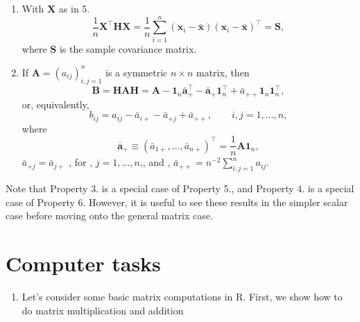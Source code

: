 \documentclass[]{book}
\providecommand{\tightlist}{%
  \setlength{\itemsep}{0pt}\setlength{\parskip}{0pt}}
\theoremstyle{definition}
\theoremstyle{definition}
\theoremstyle{definition}
\theoremstyle{remark}
\begin{document}
\begin{enumerate}
\[\begin{array}{ccc}
  -&(\boldsymbol x_2 -\bar{\boldsymbol x})^\top&-\\
  &\vdots&\\
  -&(\boldsymbol x_n - \bar{\boldsymbol x})^\top&-
  \end{array}\right ]= \left[ \boldsymbol x_1 -\bar{\boldsymbol x}, \ldots , \boldsymbol x_n-\bar{\boldsymbol x}\right]^\top
  \]
  where \[\bar{\boldsymbol x} = \frac{1}{n} \sum_{i=1}^n \boldsymbol x_i \in \mathbb{R}^p\]
  is the p-dimensional sample mean of \(\boldsymbol x_1, \ldots, \boldsymbol x_n\in \mathbb{R}^p\). In words, \(\boldsymbol H\) has subtracted the column mean from each column of \(\boldsymbol X\).
\item
  With \(\boldsymbol X\) as in 5.
  \[
  \frac{1}{n}\boldsymbol X^\top \boldsymbol H\boldsymbol X=\frac{1}{n} \sum_{i=1}^n (\boldsymbol x_i -\bar{\boldsymbol x})(\boldsymbol x_i -\bar{\boldsymbol x})^\top =\boldsymbol S,
  \]
  where \(\boldsymbol S\) is the sample covariance matrix.
\item
  If \(\boldsymbol A=(a_{ij})_{i,j=1}^n\) is a symmetric \(n \times n\) matrix, then
  \[
  \boldsymbol B=\boldsymbol H\boldsymbol A\boldsymbol H= \boldsymbol A- {\mathbf 1}_n \bar{\boldsymbol a}_+^\top -\bar{\boldsymbol a}_+{\mathbf 1}_n^\top +\bar{a}_{++}{\mathbf 1}_n {\mathbf 1}_n^\top,
  \]
  or, equivalently,
  \[
  b_{ij}=a_{ij}-\bar{a}_{i+}-\bar{a}_{+j}+\bar{a}_{++}, \qquad i,j=1, \ldots , n,
  \]
  where
  \[
  \bar{\boldsymbol a}_{+}\equiv (\bar{a}_{1+}, \ldots , \bar{a}_{n+})^\top=\frac{1}{n}\boldsymbol A{\mathbf 1}_n,
  \]
  \(\bar{a}_{+j}=\bar{a}_{j+}\) , for , \(j=1, \ldots , n\),, and , \(\bar{a}_{++}=n^{-2}\sum_{i,j=1}^n a_{ij}\).
\end{enumerate}

Note that Property 3. is a special case of Property 5., and Property 4. is a special case of Property 6.
However, it is useful to see these results in the simpler scalar case before moving onto the general matrix case.

\hypertarget{tasks-ch2}{%
\section{Computer tasks}\label{tasks-ch2}}

\begin{enumerate}
\def\labelenumi{\arabic{enumi}.}
\tightlist
\item
  Let's consider some basic matrix computations in R. First, we show how to do matrix multiplication and addition
\end{enumerate}
\end{document}
